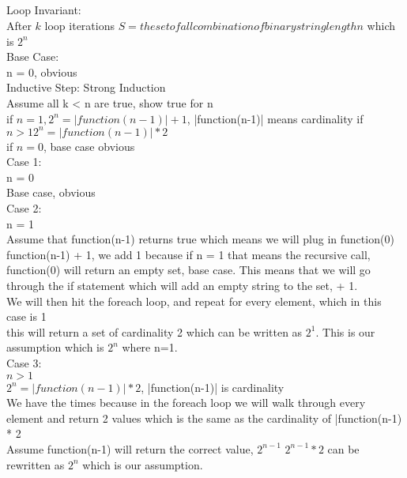 \documentclass[letterpaper]{article}
\begin{document}
		\subsection{}
        	Loop Invariant: \\ After $k$ loop iterations $S = the set of all combination of binary string length n$ which is $2^n$\\
        	Base Case: \\ n = 0, obvious\\
            Inductive Step: Strong Induction\\ 
            Assume all k < n are true, show true for n\\
            if $n = 1, 2^n = |function(n-1)| + 1$, |function(n-1)| means cardinality
            if $n > 1 2^n = |function(n-1)| * 2$\\
            if $n = 0$, base case obvious\\
            Case 1: \\n = 0\\
            Base case, obvious\\
            Case 2: \\n = 1\\
            Assume that function(n-1) returns true which means we will plug in function(0)\\
           	function(n-1) + 1, we add 1 because if n = 1 that means the recursive call, function(0) will return an empty set, base case.
            This means that we will go through the if statement which will add an empty string to the set, + 1.\\
            We will then hit the foreach loop, and repeat for every element, which in this case is 1\\
            this will return a set of cardinality 2 which can be written as $2^1$.  This is our assumption which is $2^n$ where n=1.\\
            Case 3:\\ $n > 1$\\
            $2^n = |function(n-1)| * 2$, |function(n-1)| is cardinality\\
            We have the times because in the foreach loop we will walk through every element and return 2 values which is the same as the cardinality of |function(n-1) * 2\\
            Assume function(n-1) will return the correct value, $2^{n-1}$
            $2^{n-1} * 2$ can be rewritten as $2^n$ which is our assumption.
	\section{}
\end{document}
